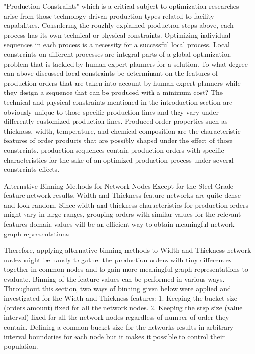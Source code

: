 "Production Constraints" which is a critical subject to optimization researches
arise from those technology-driven production types related to facility
capabilities.
Considering the roughly explained production steps above, each process has
its own technical or physical constraints.
Optimizing individual sequences in each process is a necessity for a successful
local process. Local constraints on different processes are integral parts of a
global optimization problem that is tackled by human expert planners for a
solution.
To what degree can above discussed local constraints be determinant
on the features of production orders that are taken into account by human
expert planners while they design a sequence that can be produced with a
minimum cost?
The technical and physical constraints mentioned in the introduction section
are obviously unique to those specific production lines and they vary under
differently customized production lines. Produced order properties such as
thickness, width, temperature, and chemical composition are the characteristic
features of order products that are possibly shaped under the effect of those
constraints.
production sequences contain production orders
with specific characteristics for the sake of an optimized production process
under several constraints effects.

Alternative Binning Methods for Network Nodes
Except for the Steel Grade feature network results, Width and Thickness feature
networks are quite dense and look random. Since width and thickness
characteristics for production orders might vary in large ranges, grouping orders
with similar values for the relevant features domain values will be an
efficient way to obtain meaningful network graph representations.

Therefore, applying alternative binning methods to Width and Thickness network
nodes might be handy to gather the production orders with tiny differences
together in common nodes and to gain more meaningful graph representations
to evaluate. Binning of the feature values can be performed in various
ways. Throughout this section, two ways of binning given below were applied
and investigated for the Width and Thickness features:
1. Keeping the bucket size (orders amount) fixed for all the network nodes.
2. Keeping the step size (value interval) fixed for all the network nodes regardless
of number of order they contain.
Defining a common bucket size for the networks results in arbitrary interval
boundaries for each node but it makes it possible to control their population.

